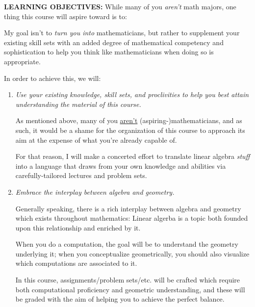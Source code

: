 \documentclass[12pt,oneside]{amsart}
\begin{document}
\noindent \textbf{LEARNING OBJECTIVES:} While many of you \textit{aren't} math majors, one thing this course will aspire toward is to: \vspace{-3mm}\begin{center}\end{center}\vspace{-1.5mm}

\noindent My goal isn't to \textit{turn you into} mathematicians, but rather to supplement your existing skill sets with an added degree of mathematical competency and sophistication to help you think like mathematicians when doing so is appropriate. 

\noindent In order to achieve this, we will:\vspace{-1.5mm}
\begin{enumerate}[label=(Obj \arabic*),leftmargin=0.75in,rightmargin=0.25in,itemsep=1.5mm]
	\item \textit{Use your existing knowledge, skill sets, and proclivities to help you best attain understanding the material of this course.}
	
	As mentioned above, many of you \ul{aren't} (aspiring-)mathematicians, and as such, it would be a shame for the organization of this course to approach its aim at the expense of what you're already capable of. 
	
	For that reason, I will make a concerted effort to translate linear algebra \textit{stuff} into a language that draws from your own knowledge and abilities via carefully-tailored lectures and problem sets.
	
	\item \textit{Embrace the interplay between algebra and geometry.}
	
	Generally speaking, there is a rich interplay between algebra and geometry which exists throughout mathematics: Linear algerba is a topic both founded upon this relationship and enriched by it. 
	
	When you do a computation, the goal will be to understand the geometry underlying it; when you conceptualize geometrically, you should also visualize which computations are associated to it.
	
	In this course, assignments/problem sets/etc. will be crafted which require both computational proficiency and geometric understanding, and these will be graded with the aim of helping you to achieve the perfect balance.
	 

\end{enumerate}
\end{document}
